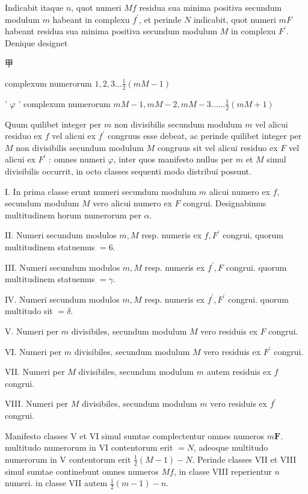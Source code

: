 \documentclass[10pt]{article}
\begin{document}
Indicabit itaque \(n\), quot numeri \(M f\) residua sua minima positiva secundum modulum \(m\) habeant in complexu \(f^{\prime}\), et perinde \(N\) indicabit, quot numeri \(m F\) habeant residua sua minima positiva secundum modulum \(M\) in complexu \(F^{\prime}\). Denique designet

\begin{CJK}{UTF8}{mj}甲\end{CJK} complexum numerorum \(1,2,3 \ldots \frac{1}{2}(m M-1)\)

' \(\varphi\) ' complexum numerorum \(m M-1, m M-2, m M-3 \ldots \ldots \frac{1}{2}(m M+1)\)

Quum quilibet integer per \(m\) non divisibilis secundum modulum \(m\) vel alicui residuo ex \(f\) vel alicui ex \(f^{\prime}\) congruus esse debeat, ac perinde quilibet integer per \(M\) non divisibilis secundum modulum \(M\) congruus sit vel alicui residuo ex \(F\) vel alicui ex \(F^{\prime}\) : omnes numeri \(\varphi\), inter quos manifesto nullus per \(m\) et \(M\) simul divisibilis occurrit, in octo classes sequenti modo distribui possunt.

I. In prima classe erunt numeri secundum modulum \(m\) alicui numero ex \(f\), secundum modulum \(M\) vero alicui numero ex \(F\) congrui. Designabimus multitudinem horum numerorum per \(\alpha\).

II. Numeri secundum modulos \(m, M\) resp. numeris ex \(f, F^{\prime}\) congrui, quorum multitudinem statuemus \(=6\).

III. Numeri secundum modulos \(m, M\) resp. numeris ex \(f^{\prime}, F\) congrui. quorum multitudinem statuemus \(=\gamma\).

IV. Numeri secundum modulos \(m, M\) resp. numeris ex \(f^{\prime}, F^{\prime}\) congrui. quorum multitudo sit \(=\delta\).

V. Numeri per \(m\) divisibiles, secundum modulum \(M\) vero residuis ex \(F\) congrui.

VI. Numeri per \(m\) divisibiles, secundum modulum \(M\) vero residuis ex \(F^{\prime}\) congrui.

VII. Numeri per \(M\) divisibiles, secundum modulum \(m\) autem residuis ex \(f\) congrui.

VIII. Numeri per \(M\) divisibiles, secundum modulum \(m\) vero residuis ex \(f^{\prime}\) congrui.

Manifesto classes V et VI simul sumtae complectentur omnes numeros \(m \boldsymbol{F}\). multitudo numerorum in VI contentorum erit \(=N\), adeoque multitudo numerorum in V contentorum erit \(\frac{1}{2}(M-1)-N\). Perinde classes VII et VIII simul sumtae continebunt omnes numeros \(M f\), in classe VIII reperientur \(n\) numeri. in classe VII autem \(\frac{1}{2}(m-1)-n\).
\end{document}
